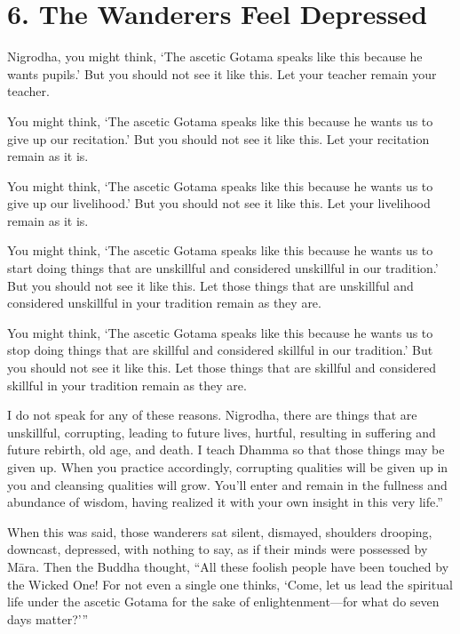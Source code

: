 \documentclass[12pt,openany]{book}%
\begin{document}
\section*{6. The Wanderers Feel Depressed }

Nigrodha, you might think, ‘The ascetic Gotama speaks like this because he wants pupils.’ But you should not see it like this. Let your teacher remain your teacher. 

You might think, ‘The ascetic Gotama speaks like this because he wants us to give up our recitation.’ But you should not see it like this. Let your recitation remain as it is. 

You might think, ‘The ascetic Gotama speaks like this because he wants us to give up our livelihood.’ But you should not see it like this. Let your livelihood remain as it is. 

You might think, ‘The ascetic Gotama speaks like this because he wants us to start doing things that are unskillful and considered unskillful in our tradition.’ But you should not see it like this. Let those things that are unskillful and considered unskillful in your tradition remain as they are. 

You might think, ‘The ascetic Gotama speaks like this because he wants us to stop doing things that are skillful and considered skillful in our tradition.’ But you should not see it like this. Let those things that are skillful and considered skillful in your tradition remain as they are. 

I do not speak for any of these reasons. Nigrodha, there are things that are unskillful, corrupting, leading to future lives, hurtful, resulting in suffering and future rebirth, old age, and death. I teach Dhamma so that those things may be given up. When you practice accordingly, corrupting qualities will be given up in you and cleansing qualities will grow. You’ll enter and remain in the fullness and abundance of wisdom, having realized it with your own insight in this very life.” 

When this was said, those wanderers sat silent, dismayed, shoulders drooping, downcast, depressed, with nothing to say, as if their minds were possessed by \textsanskrit{Māra}. Then the Buddha thought, “All these foolish people have been touched by the Wicked One! For not even a single one thinks, ‘Come, let us lead the spiritual life under the ascetic Gotama for the sake of enlightenment—for what do seven days matter?’” 
\end{document}
